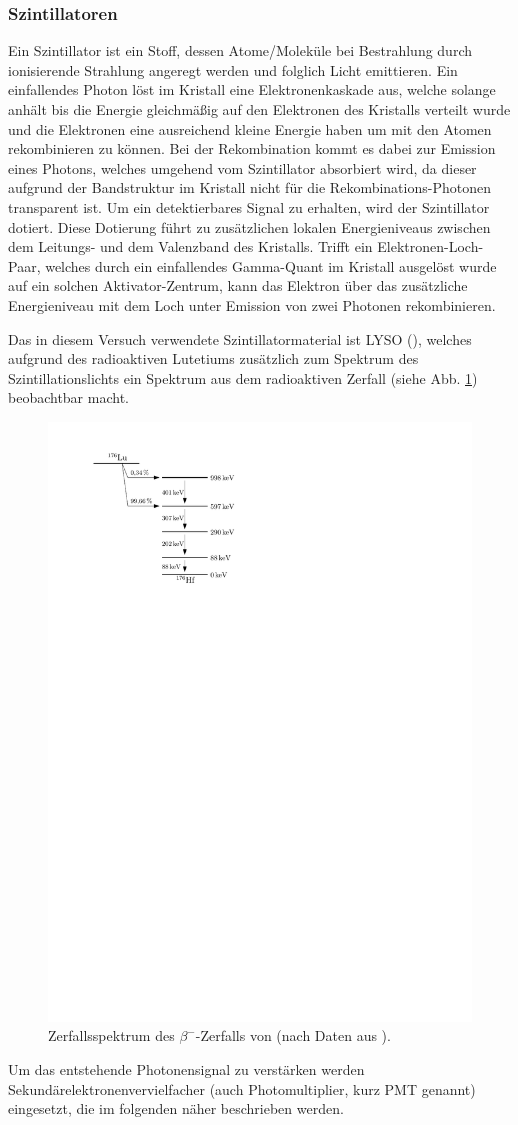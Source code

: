 \documentclass[11pt, a4paper]{article}
\numberwithin{equation}{section}
\begin{document}
\subsubsection{Szintillatoren}

Ein Szintillator ist ein Stoff, dessen Atome/Moleküle bei Bestrahlung durch ionisierende Strahlung angeregt werden und folglich Licht emittieren.
Ein einfallendes Photon löst im Kristall eine Elektronenkaskade aus, welche solange anhält bis die Energie gleichmäßig auf den Elektronen des Kristalls verteilt wurde und die Elektronen eine ausreichend kleine Energie haben um mit den Atomen rekombinieren zu können.
Bei der Rekombination kommt es dabei zur Emission eines Photons, welches umgehend vom Szintillator absorbiert wird, da dieser aufgrund der Bandstruktur im Kristall nicht für die Rekombinations-Photonen transparent ist.
Um ein detektierbares Signal zu erhalten, wird der Szintillator dotiert.
Diese Dotierung führt zu zusätzlichen lokalen Energieniveaus zwischen dem Leitungs- und dem Valenzband des Kristalls.
Trifft ein Elektronen-Loch-Paar, welches durch ein einfallendes Gamma-Quant im Kristall ausgelöst wurde auf ein solchen Aktivator-Zentrum, kann das Elektron über das zusätzliche Energieniveau mit dem Loch unter Emission von zwei Photonen rekombinieren.

Das in diesem Versuch verwendete Szintillator\-material ist LYSO (), welches aufgrund des radioaktiven Lute\-tiums zusätzlich zum Spektrum des Szin\-tillations\-lichts ein Spektrum aus dem radioaktiven Zerfall (siehe Abb. \ref{fig:lu_decay_scheme}) beobachtbar macht.
\begin{figure}[htbp]
	\centering
	\includegraphics[width=.5\textwidth]{./figures/lu_decay_scheme}
	\caption{Zerfallsspektrum des $\beta^-$-Zerfalls von  (nach Daten aus \cite{nuc_datasheet}).}
	\label{fig:lu_decay_scheme}
\end{figure}
Um das entstehende Photonensignal zu verstärken werden Sekundärelektronenvervielfacher (auch Photomultiplier, kurz PMT genannt) eingesetzt, die im folgenden näher beschrieben werden.
\end{document}
